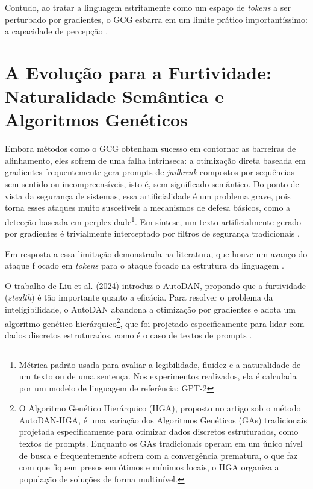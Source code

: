 \documentclass{article}
\begin{document}
Contudo, ao tratar a linguagem estritamente como um espaço de \textit{tokens} a ser 
perturbado por gradientes, o GCG esbarra em um limite prático importantíssimo: a 
capacidade de percepção \cite{zou2023universaltransferableadversarialattacks}.

\section{A Evolução para a Furtividade: Naturalidade Semântica e Algoritmos Genéticos}
Embora métodos como o GCG \cite{zou2023universaltransferableadversarialattacks} 
obtenham sucesso em contornar as barreiras de alinhamento, eles sofrem de uma falha intrínseca: 
a otimização direta baseada em gradientes frequentemente gera prompts de \textit{jailbreak} compostos 
por sequências sem sentido ou incompreensíveis, isto é, sem significado semântico. Do ponto de vista 
da segurança de sistemas, essa artificialidade é um problema grave, pois torna esses ataques muito 
suscetíveis a mecanismos de defesa básicos, como a detecção baseada em 
perplexidade\footnote{Métrica padrão usada para avaliar a legibilidade, fluidez e a naturalidade 
de um texto ou de uma sentença. Nos experimentos realizados, ela é calculada por um modelo de 
linguagem de referência: \textsc{GPT-2}}. Em síntese, um texto artificialmente gerado por 
gradientes é trivialmente interceptado por filtros de segurança tradicionais 
\cite{liu2024autodangeneratingstealthyjailbreak}.


Em resposta a essa limitação demonstrada na literatura, que houve um avanço do ataque f
ocado em \textit{tokens} para o ataque focado na estrutura da linguagem 
\cite{liu2024autodangeneratingstealthyjailbreak}. 

O trabalho de Liu et al. (2024) \cite{liu2024autodangeneratingstealthyjailbreak} introduz 
o AutoDAN, propondo que a furtividade (\textit{stealth}) é tão importante quanto a eficácia. 
Para resolver o problema da inteligibilidade, o AutoDAN abandona a otimização por gradientes 
e adota um algoritmo genético hierárquico\footnote{O Algoritmo Genético Hierárquico (HGA), 
proposto no artigo sob o método AutoDAN-HGA, é uma variação dos Algoritmos Genéticos (GAs) 
tradicionais projetada especificamente para otimizar dados discretos estruturados, como textos 
de prompts. Enquanto os GAs tradicionais operam em um único nível de busca e frequentemente 
sofrem com a convergência prematura, o que faz com que fiquem presos em ótimos e mínimos locais, 
o HGA organiza a população de soluções de forma multinível.}, que foi projetado especificamente 
para lidar com dados discretos estruturados, como é o caso de textos de prompts 
\cite{liu2024autodangeneratingstealthyjailbreak}.
\end{document}
